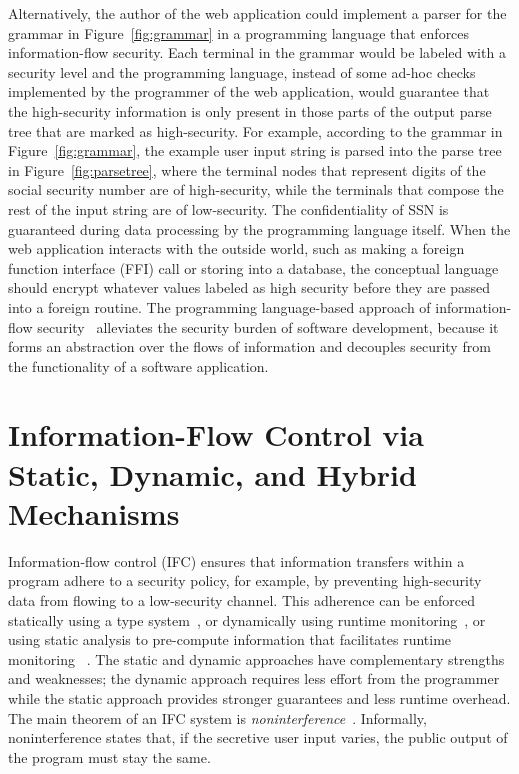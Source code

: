\documentclass[10pt, letterpaper]{article}
\begin{document}
Alternatively, the author of the web application could implement a parser for
the grammar in Figure~\ref{fig:grammar} in a programming language that enforces
information-flow security. Each terminal in the grammar would be labeled with a
security level and the programming language, instead of some ad-hoc checks
implemented by the programmer of the web application, would guarantee that the
high-security information is only present in those parts of the output parse
tree that are marked as high-security. For example, according to the grammar in
Figure~\ref{fig:grammar}, the example user input string is parsed into the parse
tree in Figure~\ref{fig:parsetree}, where the terminal nodes that represent
digits of the social security number are of {\color{red} high-security}, while
the terminals that compose the rest of the input string are of {\color{green}
  low-security}. The confidentiality of SSN is guaranteed during data processing
by the programming language itself. When the web application interacts with the
outside world, such as making a foreign function interface (FFI) call or storing
into a database, the conceptual language should encrypt whatever values labeled
as high security before they are passed into a foreign routine. The programming
language-based approach of information-flow
security~\citep{sabelfeld2003language} alleviates the security burden of
software development, because it forms an abstraction over the flows of
information and decouples security from the functionality of a software
application.

\section{Information-Flow Control via Static, Dynamic, and Hybrid Mechanisms}
\label{sec:prior-ifc}

Information-flow control (IFC) ensures that information transfers within a
program adhere to a security policy, for example, by preventing high-security
data from flowing to a low-security channel. This adherence can be enforced
statically using a type
system~\citep{volpano1996sound,Myers:1997aa,myers1999jflow}, or dynamically
using runtime
monitoring~\citep{Askarov:2009vq,austin2009efficient,Devriese:2010up,stefan2011flexible,Austin:2017uh,Xiang:2021ub},
or using static analysis to pre-compute information that facilitates runtime
monitoring
~\citep{le2005monitoring,le2007automaton,Chandra:2007we,Shroff:2007tg,russo2010dynamic,moore2011static}.
The static and dynamic approaches have complementary strengths and weaknesses;
the dynamic approach requires less effort from the programmer while the static
approach provides stronger guarantees and less runtime overhead. The main
theorem of an IFC system is \textit{noninterference}~\cite{goguen1982security}.
Informally, noninterference states that, if the secretive user input varies, the
public output of the program must stay the same.
\end{document}
